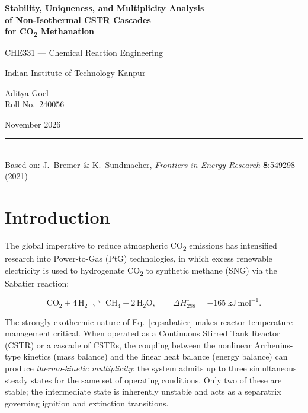 \documentclass[11pt,a4paper]{article}
\begin{document}
\begin{titlepage}
  \centering
  \vspace*{1.5cm}
  {\LARGE\bfseries Stability, Uniqueness, and Multiplicity Analysis\\[0.4em]
  of Non-Isothermal CSTR Cascades\\[0.4em]
  for \texorpdfstring{CO\textsubscript{2}}{CO2} Methanation\par}
  \vspace{1.0cm}
  {\large CHE331 — Chemical Reaction Engineering\par}
  \vspace{0.5cm}
  {\large Indian Institute of Technology Kanpur\par}
  \vspace{1.5cm}
  {\large Aditya Goel\\Roll No.\ 240056\par}
  \vspace{0.5cm}
  {\large November 2026\par}
  \vspace{2.0cm}
  \rule{10cm}{0.6pt}\\[0.4em]
  {\small Based on: J.\ Bremer \& K.\ Sundmacher, \textit{Frontiers in Energy Research} \textbf{8}:549298 (2021)}
\end{titlepage}

\tableofcontents
\thispagestyle{fancy}
\newpage

\section{Introduction}
\label{sec:intro}

The global imperative to reduce atmospheric CO\textsubscript{2} emissions has
intensified research into Power-to-Gas (PtG) technologies, in which excess
renewable electricity is used to hydrogenate CO\textsubscript{2} to synthetic
methane (SNG) via the Sabatier reaction:

\begin{equation}
  \mathrm{CO_2 + 4\,H_2 \;\rightleftharpoons\; CH_4 + 2\,H_2O},
  \qquad \Delta H_{298}^{\circ} = -165\ \mathrm{kJ\,mol^{-1}}.
  \label{eq:sabatier}
\end{equation}

The strongly exothermic nature of Eq.~\eqref{eq:sabatier} makes reactor
temperature management critical. When operated as a Continuous Stirred Tank
Reactor (CSTR) or a cascade of CSTRs, the coupling between the nonlinear
Arrhenius-type kinetics (mass balance) and the linear heat balance (energy
balance) can produce \textit{thermo-kinetic multiplicity}: the system admits
up to three simultaneous steady states for the same set of operating conditions.
Only two of these are stable; the intermediate state is inherently unstable and
acts as a separatrix governing ignition and extinction transitions.
\end{document}
